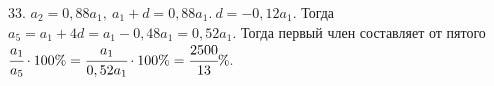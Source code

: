 33. $a_2=0,88a_1,\ a_1+d=0,88a_1.\ d=-0,12a_1.$ Тогда $a_5=a_1+4d=a_1-0,48a_1=0,52a_1.$ Тогда первый член составляет от пятого $\cfrac{a_1}{a_5}\cdot100\%=
\cfrac{a_1}{0,52a_1}\cdot100\%=\cfrac{2500}{13}\%.$\\
